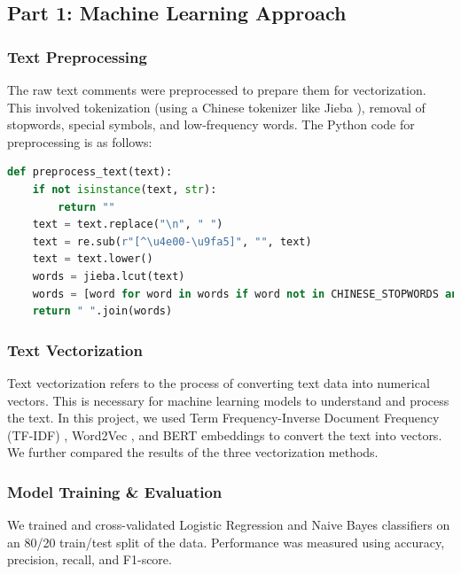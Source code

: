 \documentclass{article}
\begin{document}
\subsection{Part 1: Machine Learning Approach}
\label{ssec:ml_approach}

\subsubsection{Text Preprocessing}
\label{sssec:preprocessing}
The raw text comments were preprocessed to prepare them for vectorization. 
This involved tokenization (using a Chinese tokenizer like Jieba \cite{Jieba2012}), removal of stopwords, special symbols, 
and low-frequency words.
The Python code for preprocessing is as follows:
\begin{lstlisting}[language=Python]
def preprocess_text(text):
    if not isinstance(text, str):
        return ""
    text = text.replace("\n", " ")
    text = re.sub(r"[^\u4e00-\u9fa5]", "", text)
    text = text.lower()
    words = jieba.lcut(text)
    words = [word for word in words if word not in CHINESE_STOPWORDS and len(word) > 1]
    return " ".join(words)
\end{lstlisting}

\subsubsection{Text Vectorization}
\label{sssec:vectorization}
Text vectorization refers to the process of converting text data into numerical vectors. 
This is necessary for machine learning models to understand and process the text. 
In this project, we used Term Frequency-Inverse Document Frequency (TF-IDF) \cite{SparckJones1972} , Word2Vec \cite{Mikolov2013}, 
and BERT embeddings \cite{Devlin2019}
to convert the text into vectors. We further compared the results of the three vectorization methods.


\subsubsection{Model Training \& Evaluation}
\label{sssec:ml_training}
We trained and cross-validated Logistic Regression \cite{Cox1958} and Naive Bayes classifiers \cite{Bishop2006} on an 80/20 train/test 
split of the data. Performance was measured using accuracy, precision, recall, and F1-score.
\end{document}
